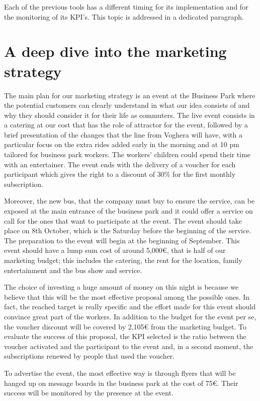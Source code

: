 

Each of the previous tools has a different timing for its implementation and for the monitoring of its KPI’s. This topic is addressed in a dedicated paragraph.
\section{A deep dive into the marketing strategy}
The main plan for our marketing strategy is an event at the Business Park where the potential customers can clearly understand in what our idea consists of and why they should consider it for their life as commuters. The live event consists in a catering at our cost that has the role of attractor for the event, followed by a brief presentation of the changes that the line from Voghera will have, with a particular focus on the extra rides added early in the morning and at 10 pm tailored for business park workers. The workers’ children could spend their time with an entertainer. The event ends with the delivery of a voucher for each participant which gives the right to a discount of 30\% for the first monthly subscription.

Moreover, the new bus, that the company must buy to ensure the service, can be exposed at the main entrance of the business park and it could offer a service on call for the ones that want to participate at the event. The event should take place on 8th October, which is the Saturday before the beginning of the service. The preparation to the event will begin at the beginning of September. This event should have a lump sum cost of around 5,000€, that is half of our marketing budget; this includes the catering, the rent for the location, family entertainment and the bus show and service.

The choice of investing a huge amount of money on this night is because we believe that this will be the most effective proposal among the possible ones. In fact, the reached target is really specific and the effort made for this event should convince great part of the workers. In addition to the budget for the event per se, the voucher discount will be covered by 2,105€ from the marketing budget. To evaluate the success of this proposal, the KPI selected is the ratio between the voucher activated and the participant to the event and, in a second moment, the subscriptions renewed by people that used the voucher. 

To advertise the event, the most effective way is through flyers that will be hanged up on message boards in the business park at the cost of 75€. Their success will be monitored by the presence at the event. 

